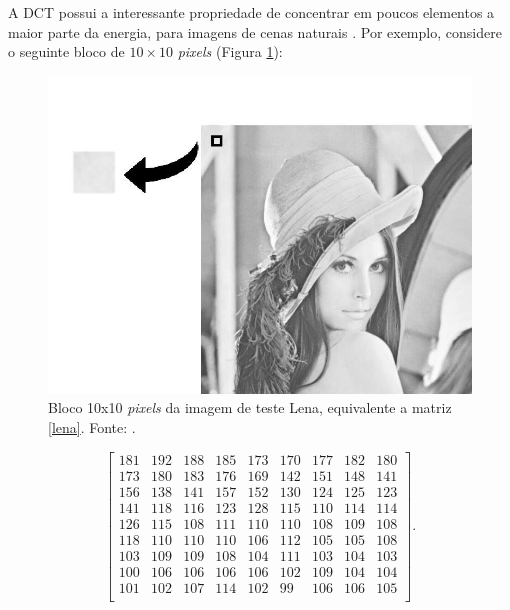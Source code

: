 A DCT possui a interessante propriedade de concentrar em poucos elementos a maior parte da energia, para imagens de cenas naturais \cite{khayam2003discrete}. Por exemplo, considere o seguinte bloco de $10 \times 10$ \textit{pixels} (Figura \ref{PEDACO_LENA}):
\clearpage
\begin{figure}[h]
	\centering
	\includegraphics[scale=0.4]{figuras/lena_quadrado.jpg}
	\caption{Bloco 10x10 \textit{pixels} da imagem de teste Lena, equivalente a matriz \ref{lena}. Fonte: \cite{imagensTeste}.}
	\label{PEDACO_LENA}
\end{figure}
\begin{center}


\begin{equation}
\label{lena}
\begin{bmatrix}
  181&  192&  188&  185&  173&  170&  177&  182&  180\\
  173&  180&  183&  176&  169&  142&  151&  148&  141\\
  156&  138&  141&  157&  152&  130&  124&  125&  123\\
  141&  118&  116&  123&  128&  115&  110&  114&  114\\
  126&  115&  108&  111&  110&  110&  108&  109&  108\\
  118&  110&  110&  110&  106&  112&  105&  105&  108\\
  103&  109&  109&  108&  104&  111&  103&  104&  103\\
  100&  106&  106&  106&  106&  102&  109&  104&  104\\
  101&  102&  107&  114&  102&   99&  106&  106&  105\\
\end{bmatrix}.
\end{equation}
\end{center}

